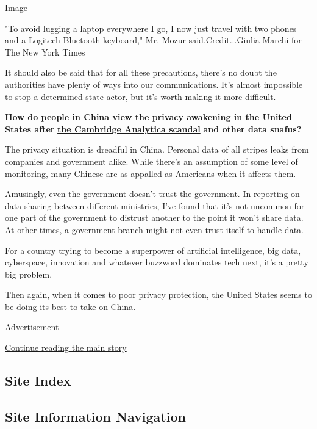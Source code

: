 Image

"To avoid lugging a laptop everywhere I go, I now just travel with two
phones and a Logitech Bluetooth keyboard," Mr. Mozur
said.Credit...Giulia Marchi for The New York Times

It should also be said that for all these precautions, there's no doubt
the authorities have plenty of ways into our communications. It's almost
impossible to stop a determined state actor, but it's worth making it
more difficult.

\textbf{How do people in China view the privacy awakening in the United
States after}
\textbf{\href{https://www.nytimes3xbfgragh.onion/2018/03/17/us/politics/cambridge-analytica-trump-campaign.html}{the
Cambridge Analytica scandal}} \textbf{and other data snafus?}

The privacy situation is dreadful in China. Personal data of all stripes
leaks from companies and government alike. While there's an assumption
of some level of monitoring, many Chinese are as appalled as Americans
when it affects them.

Amusingly, even the government doesn't trust the government. In
reporting on data sharing between different ministries, I've found that
it's not uncommon for one part of the government to distrust another to
the point it won't share data. At other times, a government branch might
not even trust itself to handle data.

For a country trying to become a superpower of artificial intelligence,
big data, cyberspace, innovation and whatever buzzword dominates tech
next, it's a pretty big problem.

Then again, when it comes to poor privacy protection, the United States
seems to be doing its best to take on China.

Advertisement

\protect\hyperlink{after-bottom}{Continue reading the main story}

\hypertarget{site-index}{%
\subsection{Site Index}\label{site-index}}

\hypertarget{site-information-navigation}{%
\subsection{Site Information
Navigation}\label{site-information-navigation}}

